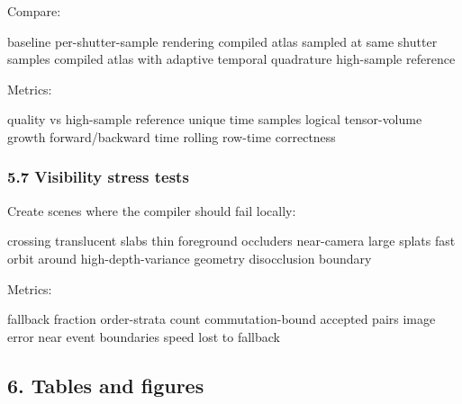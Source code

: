 \documentclass[
]{article}
\newenvironment{Shaded}{}{}
\newcommand{\NormalTok}[1]{#1}
\begin{document}
Compare:

\begin{Shaded}
\begin{Highlighting}[]
\NormalTok{baseline per{-}shutter{-}sample rendering}
\NormalTok{compiled atlas sampled at same shutter samples}
\NormalTok{compiled atlas with adaptive temporal quadrature}
\NormalTok{high{-}sample reference}
\end{Highlighting}
\end{Shaded}

Metrics:

\begin{Shaded}
\begin{Highlighting}[]
\NormalTok{quality vs high{-}sample reference}
\NormalTok{unique time samples}
\NormalTok{logical tensor{-}volume growth}
\NormalTok{forward/backward time}
\NormalTok{rolling row{-}time correctness}
\end{Highlighting}
\end{Shaded}

\subsubsection{5.7 Visibility stress
tests}\label{visibility-stress-tests}

Create scenes where the compiler should fail locally:

\begin{Shaded}
\begin{Highlighting}[]
\NormalTok{crossing translucent slabs}
\NormalTok{thin foreground occluders}
\NormalTok{near{-}camera large splats}
\NormalTok{fast orbit around high{-}depth{-}variance geometry}
\NormalTok{disocclusion boundary}
\end{Highlighting}
\end{Shaded}

Metrics:

\begin{Shaded}
\begin{Highlighting}[]
\NormalTok{fallback fraction}
\NormalTok{order{-}strata count}
\NormalTok{commutation{-}bound accepted pairs}
\NormalTok{image error near event boundaries}
\NormalTok{speed lost to fallback}
\end{Highlighting}
\end{Shaded}

\subsection{6. Tables and figures}\label{tables-and-figures}
\end{document}
